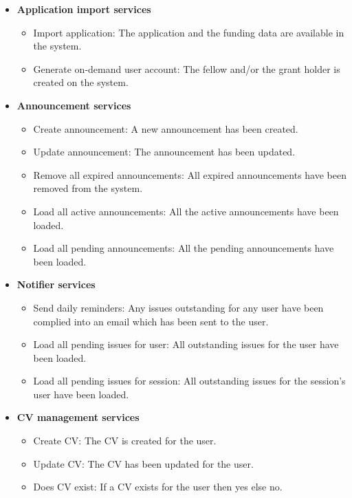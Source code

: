 \documentclass[12pt]{article}
\begin{document}
\begin{itemize}
	\item \textbf{Application import services}
		\begin{itemize}
			\item Import application: The application and the funding data are available in the system.
			\item Generate on-demand user account: The fellow and/or the grant holder is created on the system. 					
		\end{itemize}
		
	\item \textbf{Announcement services}
		\begin{itemize}
			\item Create announcement: A new announcement has been created.
			\item Update announcement: The announcement has been updated.
			\item Remove all expired announcements: All expired announcements have been removed from the system.
			\item Load all active announcements: All the active announcements have been loaded.
			\item Load all pending announcements: All the pending announcements have been loaded. 				
		\end{itemize}
		
	\item \textbf{Notifier services}
		\begin{itemize}
			\item Send daily reminders: Any issues outstanding for any user have been complied into an email which has been sent to the user.
			\item Load all pending issues for user: All outstanding issues for the user have been loaded.	
			\item Load all pending issues for session: All outstanding issues for the session's user have been loaded.				
		\end{itemize}
		
	\item \textbf{CV management services}
		\begin{itemize}
			\item Create CV: The CV is created for the user.
			\item Update CV: The CV has been updated for the user.
			\item Does CV exist: If a CV exists for the user then yes else no.					
		\end{itemize}	
\end{itemize}
\end{document}
